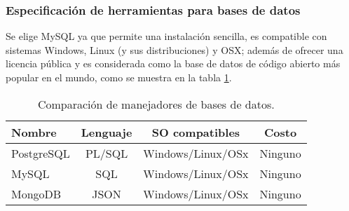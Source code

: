 
\subsubsection{Especificación de herramientas para bases de datos}

Se elige MySQL ya que permite una instalación sencilla, es compatible con sistemas Windows, Linux (y sus distribuciones) y OSX; además de ofrecer una licencia pública y es considerada como la base de datos de código abierto más popular en el mundo, como se muestra en la tabla \ref{tabla:bases-de-datos}.

\begin{table}[H]
	\centering
	\caption{Comparación de manejadores de bases de datos.}
	\label{tabla:bases-de-datos}
	\begin{tabular}{|l|c|c|c|}
		\hline
		\centering\textbf{Nombre} &
		\textbf{Lenguaje} &
		\textbf{SO compatibles} &
		\textbf{Costo}
		\\ \hline		
		PostgreSQL &
		PL/SQL &
		Windows/Linux/OSx &
		Ninguno
		\\ \hline
		\rowcolor{colorGrisClaro}
		MySQL &
		SQL &
		Windows/Linux/OSx &
		Ninguno
		\\ \hline
		MongoDB &
		JSON &
		Windows/Linux/OSx &
		Ninguno
		\\ \hline
	\end{tabular}
\end{table}
